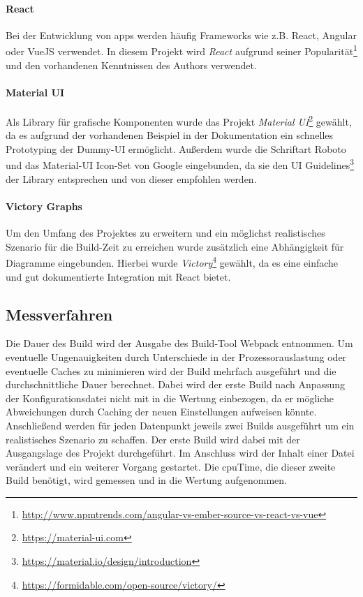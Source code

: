 \documentclass[11pt]{report}
\begin{document}
				\paragraph{React} Bei der Entwicklung von \Glspl{app} werden häufig Frameworks wie z.B. React, Angular oder VueJS verwendet. In diesem Projekt wird \emph{React} aufgrund seiner Popularität\footnote{\url{http://www.npmtrends.com/angular-vs-ember-source-vs-react-vs-vue}} und den vorhandenen Kenntnissen des Authors verwendet.

				\paragraph{Material UI} Als Library für grafische Komponenten wurde das Projekt \emph{Material UI}\footnote{\url{https://material-ui.com}} gewählt, da es aufgrund der vorhandenen Beispiel in der Dokumentation ein schnelles Prototyping der Dummy-UI ermöglicht. Außerdem wurde die Schriftart Roboto und das Material-UI Icon-Set von Google eingebunden, da sie den UI Guidelines\footnote{\url{https://material.io/design/introduction}} der Library entsprechen und von dieser empfohlen werden.

				\paragraph{Victory Graphs} Um den Umfang des Projektes zu erweitern und ein möglichst realistisches Szenario für die Build-Zeit zu erreichen wurde zusätzlich eine Abhängigkeit für Diagramme eingebunden. Hierbei wurde \emph{Victory}\footnote{\url{https://formidable.com/open-source/victory/}} gewählt, da es eine einfache und gut dokumentierte Integration mit React bietet.

			\subsection{Messverfahren}
				Die Dauer des Build wird der Ausgabe des Build-Tool Webpack entnommen. Um eventuelle Ungenauigkeiten durch Unterschiede in der Prozessorauslastung oder eventuelle Caches zu minimieren wird der Build mehrfach ausgeführt und die durchschnittliche Dauer berechnet. Dabei wird der erste Build nach Anpassung der Konfigurationsdatei nicht mit in die Wertung einbezogen, da er mögliche Abweichungen durch Caching der neuen Einstellungen aufweisen könnte. Anschließend werden für jeden Datenpunkt jeweils zwei Builds ausgeführt um ein realistisches Szenario zu schaffen. Der erste Build wird dabei mit der Ausgangslage des Projekt durchgeführt. Im Anschluss wird der Inhalt einer Datei verändert und ein weiterer Vorgang gestartet. Die \Gls{cpuTime}, die dieser zweite Build benötigt, wird gemessen und in die Wertung aufgenommen.
	
\end{document}
